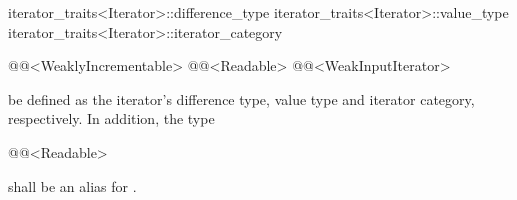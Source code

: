 \begin{removedblock}
\begin{codeblock}
iterator_traits<Iterator>::difference_type
iterator_traits<Iterator>::value_type
iterator_traits<Iterator>::iterator_category
\end{codeblock}
\end{removedblock}
\begin{addedblock}
\begin{codeblock}
@@<WeaklyIncrementable>
@@<Readable>
@@<WeakInputIterator>
\end{codeblock}
\end{addedblock}

be defined as the iterator's difference type, value type and iterator category, respectively.
In addition, the type

\begin{addedblock}
\begin{codeblock}
@@<Readable>
\end{codeblock}

shall be an alias for .
\end{addedblock}

